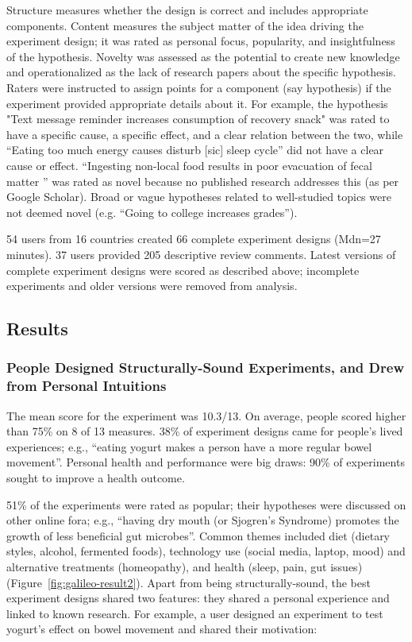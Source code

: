 Structure measures whether the design is correct and includes appropriate components. Content measures the subject matter of the idea driving the experiment design; it was rated as personal focus, popularity, and insightfulness of the hypothesis. Novelty was assessed as the potential to create new knowledge and operationalized as the lack of research papers about the specific hypothesis. Raters were instructed to assign points for a component (say hypothesis) if the experiment provided appropriate details about it. For example, the hypothesis "Text message reminder increases consumption of recovery snack" was rated to have a specific cause, a specific effect, and a clear relation between the two, while “Eating too much energy causes disturb [sic] sleep cycle” did not have a clear cause or effect. ``Ingesting non-local food results in poor evacuation of fecal matter '' was rated as novel because no published research addresses this (as per Google Scholar). Broad or vague hypotheses related to well-studied topics were not deemed novel (e.g. “Going to college increases grades”).

54 users from 16 countries created 66 complete experiment designs (Mdn=27 minutes). 37 users provided 205 descriptive review comments. Latest versions of complete experiment designs were scored as described above; incomplete experiments and older versions were removed from analysis. 

\subsection*{Results}
\subsubsection{People Designed Structurally-Sound Experiments, and Drew from Personal Intuitions}
The mean score for the experiment was 10.3/13. On average, people scored higher than 75\% on 8 of 13 measures. 38\% of experiment designs came for people's lived experiences; e.g., “eating yogurt makes a person have a more regular bowel movement”. Personal health and performance were big draws: 90\% of experiments sought to improve a health outcome. 

51\% of the experiments were rated as popular; their hypotheses were discussed on other online fora; e.g., “having dry mouth (or Sjogren's Syndrome) promotes the growth of less beneficial gut microbes”. Common themes included diet (dietary styles, alcohol, fermented foods), technology use (social media, laptop, mood) and alternative treatments (homeopathy), and health (sleep, pain, gut issues) (Figure~\ref{fig:galileo-result2}). Apart from being structurally-sound, the best experiment designs shared two features: they shared a personal experience and linked to known research. For example, a user designed an experiment to test yogurt's effect on bowel movement and shared their motivation: 

